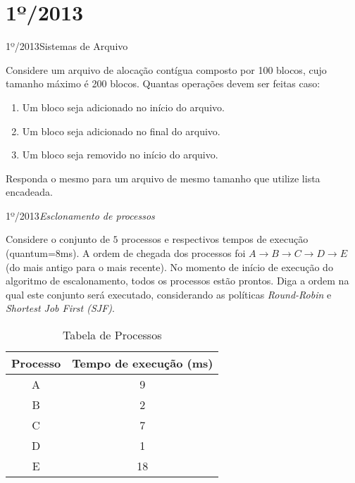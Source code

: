 \section{1º/2013}
\begin{exercicio}
  {1º/2013}{Sistemas de Arquivo}
  {Considere um arquivo de alocação contígua composto por 100 blocos, cujo tamanho máximo é 200 blocos. Quantas operações devem ser feitas caso:
  \begin{enumerate}
    \item Um bloco seja adicionado no início do arquivo.
    \item Um bloco seja adicionado no final do arquivo.
    \item Um bloco seja removido no início do arquivo.
  \end{enumerate}
  Responda o mesmo para um arquivo de mesmo tamanho que utilize lista encadeada.}
\end{exercicio}

\begin{exercicio}
  {1º/2013}{\textit{Esclonamento de processos}}
  {Considere o conjunto de $5$ processos e respectivos tempos de execução (quantum=$8$ms).
  A ordem de chegada dos processos foi $A \rightarrow B \rightarrow C \rightarrow D \rightarrow E$ (do mais antigo para o mais recente). No momento de início de execução do algoritmo de escalonamento, todos os processos estão prontos. Diga a ordem na qual este conjunto será executado, considerando as políticas \textit{Round-Robin} e \textit{Shortest Job First (SJF)}.

  \begin{table}[!h]
    \centering
    \caption{Tabela de Processos}
    \label{tab:ex3}
    \begin{tabular}{cc}
    \hline \hline
    \textbf{Processo} & \textbf{Tempo de execução (ms)} \\ \hline
    A                 & 9                               \\
    B                 & 2                              \\
    C                 & 7                               \\
    D                 & 1                               \\
    E                 & 18                              \\ \hline \hline
    \end{tabular}
    \end{table}}
\end{exercicio}

